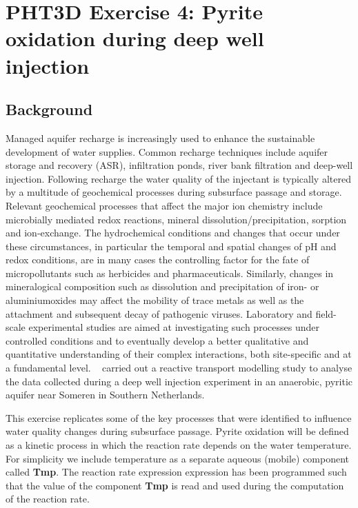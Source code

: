\newpage
\section[PHT3D Exercise 4: Pyrite oxidation during deep well injection]{PHT3D Exercise 4: Pyrite oxidation during deep well injection}
\subsection[Background]{Background}

Managed aquifer recharge is increasingly used to enhance the sustainable development of water supplies. Common recharge techniques include aquifer storage and recovery (ASR), infiltration ponds, river bank filtration and deep-well injection. Following recharge the water quality of the injectant is typically altered by a multitude of geochemical processes during subsurface passage and storage. Relevant geochemical processes that affect the major ion chemistry include microbially mediated redox reactions, mineral dissolution/precipitation, sorption and ion-exchange. The hydrochemical conditions and changes that occur under these circumstances, in particular the temporal and spatial changes of pH and redox conditions, are in many cases the controlling factor for the fate of micropollutants such as herbicides and pharmaceuticals. Similarly, changes in mineralogical composition such as dissolution and precipitation of iron- or aluminiumoxides may affect the mobility of trace metals as well as the attachment and subsequent decay of pathogenic viruses. Laboratory and field-scale experimental studies are aimed at investigating such processes under controlled conditions and to eventually develop a better qualitative and quantitative understanding of their complex interactions, both site-specific and at a fundamental level. \
\cite{prommer_stuyfzand_2005} carried out a reactive transport 
modelling study to analyse the data collected during a deep well 
injection experiment in an anaerobic, pyritic aquifer near Someren in Southern Netherlands. 

This exercise replicates some of the key processes that were identified
to influence water quality changes during subsurface passage. 
Pyrite oxidation will be defined as a kinetic process in which the
reaction rate depends on the water temperature. 
For simplicity we include temperature as a separate aqueous (mobile) component
called {\color{red} \textbf{Tmp}}.
The reaction rate expression expression has been programmed such 
that the value of the component {\color{red} \textbf{Tmp}} is read
and used during the computation of the reaction rate. 

